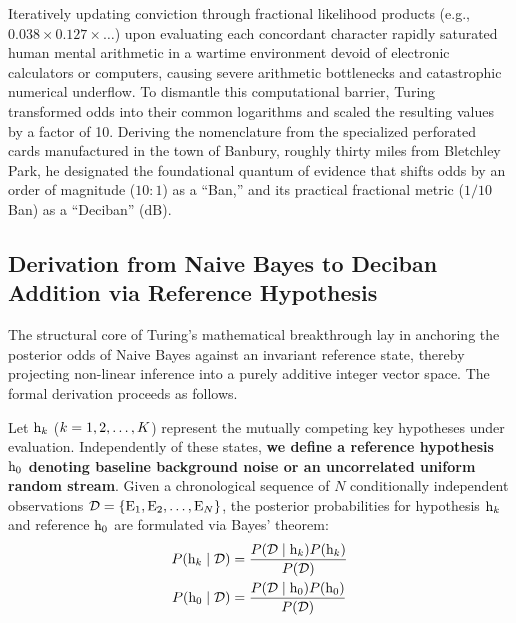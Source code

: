     Iteratively updating conviction through fractional likelihood products (e.g., $0.038 \times 0.127 \times \dots$) upon evaluating each concordant character rapidly saturated human mental arithmetic in a wartime environment devoid of electronic calculators or computers, causing severe arithmetic bottlenecks and catastrophic numerical underflow.
    To dismantle this computational barrier, Turing transformed odds into their common logarithms and scaled the resulting values by a factor of 10.
    Deriving the nomenclature from the specialized perforated cards manufactured in the town of Banbury, roughly thirty miles from Bletchley Park, he designated the foundational quantum of evidence that shifts odds by an order of magnitude ($10:1$) as a ``Ban,'' and its practical fractional metric ($1/10$ Ban) as a ``Deciban'' ($\text{dB}$).

    \subsection{Derivation from Naive Bayes to Deciban Addition via Reference Hypothesis}
    The structural core of Turing's mathematical breakthrough lay in anchoring the posterior odds of Naive Bayes against an invariant reference state, thereby projecting non-linear inference into a purely additive integer vector space. The formal derivation proceeds as follows.

    Let $\mathrm{h}_{k}$ ($k = 1, 2, \dots, K$) represent the mutually competing key hypotheses under evaluation.
    Independently of these states, \textbf{we define a reference hypothesis $\mathrm{h}_0$ denoting baseline background noise or an uncorrelated uniform random stream}.
    Given a chronological sequence of $N$ conditionally independent observations $\mathcal{D} = \{\mathrm{E}_1, \mathrm{E}_2, \dots, \mathrm{E}_N\}$, the posterior probabilities for hypothesis $\mathrm{h}_{k}$ and reference $\mathrm{h}_0$ are formulated via Bayes' theorem:
    \begin{align}
        P( \mathrm{h}_{k} \mid \mathcal{D} ) &= \frac{P( \mathcal{D} \mid \mathrm{h}_{k} ) P( \mathrm{h}_{k} )}{P( \mathcal{D} )} \label{eq:bayes_hk_en} \\
        P( \mathrm{h}_0 \mid \mathcal{D} ) &= \frac{P( \mathcal{D} \mid \mathrm{h}_0 ) P( \mathrm{h}_0 )}{P( \mathcal{D} )} \label{eq:bayes_h0_en}
    \end{align}

